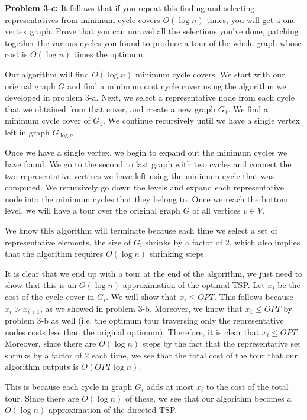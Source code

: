 \documentclass[psamsfonts]{amsart}
\newenvironment{sol}{\vspace{0.25cm}{\large \bfseries Solution:}}{\qedsymbol}
\newenvironment{prob}[1]{\begin{framed}{\large \bfseries Problem #1:}}{\end{framed}}
\begin{document}
\begin{prob}{3-c}
It follows that if you repeat this finding and selecting representatives from minimum cycle covers $O(\log n)$ times, you will get a one-vertex graph. Prove that you can unravel all the selections you've done, patching together the various cycles you found to produce a tour of the whole graph whose cost is $O(\log n)$ times the optimum.
\end{prob}
\begin{sol}
Our algorithm will find $O(\log n)$ minimum cycle covers. We start with our original graph $G$ and find a minimum cost cycle cover using the algorithm we developed in problem 3-a. Next, we select a representative node from each cycle that we obtained from that cover, and create a new graph $G_1$. We find a minimum cycle cover of $G_1$. We continue recursively until we have a single vertex left in graph $G_{\log n}$. 

Once we have a single vertex, we begin to expand out the minimum cycles we have found. We go to the second to last graph with two cycles and connect the two representative vertices we have left using the minimum cycle that was computed. We recursively go down the levels and expand each representative node into the minimum cycles that they belong to. Once we reach the bottom level, we will have a tour over the original graph $G$ of all vertices $v \in V$. 

We know this algorithm will terminate because each time we select a set of representative elements, the size of $G_i$ shrinks by a factor of 2, which also implies that the algorithm requires $O(\log n)$ shrinking steps.

It is clear that we end up with a tour at the end of the algorithm, we just need to show that this is an $O(\log n)$ approximation of the optimal TSP. Let $x_i$ be the cost of the cycle cover in $G_i$. We will show that $x_i \leq OPT$. This follows because $x_i > x_{i+1}$, as we showed in problem 3-b. Moreover, we know that $x_1 \leq OPT$ by problem 3-b as well (i.e. the optimum tour traversing only the representative nodes costs less than the original optimum). Therefore, it is clear that $x_i \leq OPT$. Moreover, since there are $O(\log n)$ steps by the fact that the representative set shrinks by a factor of 2 each time, we see that the total cost of the tour that our algorithm outputs is $O(OPT \log n)$. 

This is because each cycle in graph $G_i$ adds at most $x_i$ to the cost of the total tour. Since there are $O(\log n)$ of these, we see that our algorithm becomes a $O(\log n)$ approximation of the directed TSP.
\end{sol}
\end{document}
